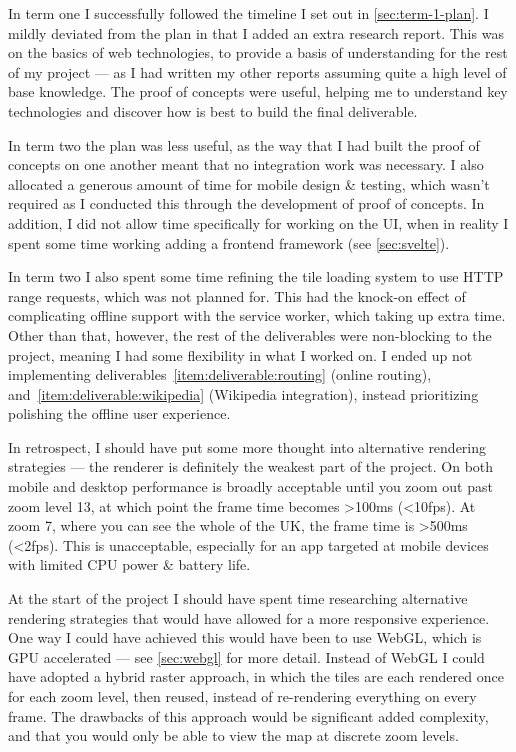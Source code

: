 \documentclass[hyphens]{final_report}
\begin{document}
In term one I successfully followed the timeline I set out in \autoref{sec:term-1-plan}. I mildly deviated from the plan in that I added an extra research report. This was on the basics of web technologies, to provide a basis of understanding for the rest of my project --- as I had written my other reports assuming quite a high level of base knowledge. The proof of concepts were useful, helping me to understand key technologies and discover how is best to build the final deliverable.

In term two the plan was less useful, as the way that I had built the proof of concepts on one another meant that no integration work was necessary. I also allocated a generous amount of time for mobile design \& testing, which wasn't required as I conducted this through the development of proof of concepts. In addition, I did not allow time specifically for working on the UI, when in reality I spent some time working adding a frontend framework (see \autoref{sec:svelte}).

In term two I also spent some time refining the tile loading system to use HTTP range requests, which was not planned for. This had the knock-on effect of complicating offline support with the service worker, which taking up extra time. Other than that, however, the rest of the deliverables were non-blocking to the project, meaning I had some flexibility in what I worked on. I ended up not implementing deliverables~\ref{item:deliverable:routing} (online routing), and~\ref{item:deliverable:wikipedia} (Wikipedia integration), instead prioritizing polishing the offline user experience.

In retrospect, I should have put some more thought into alternative rendering strategies --- the renderer is definitely the weakest part of the project. On both mobile and desktop performance is broadly acceptable until you zoom out past zoom level 13, at which point the frame time becomes \textgreater{}100ms (\textless{}10fps). At zoom 7, where you can see the whole of the UK, the frame time is \textgreater{}500ms (\textless{}2fps). This is unacceptable, especially for an app targeted at mobile devices with limited CPU power \& battery life. 

At the start of the project I should have spent time researching alternative rendering strategies that would have allowed for a more responsive experience. One way I could have achieved this would have been to use WebGL, which is GPU accelerated --- see \autoref{sec:webgl} for more detail. Instead of WebGL I could have adopted a hybrid raster approach, in which the tiles are each rendered once for each zoom level, then reused, instead of re-rendering everything on every frame. The drawbacks of this approach would be significant added complexity, and that you would only be able to view the map at discrete zoom levels.
\end{document}
